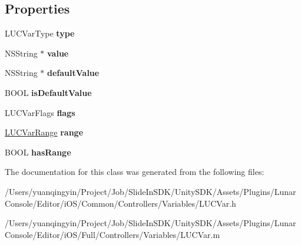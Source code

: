 \subsection*{Properties}
\begin{DoxyCompactItemize}
\item 
\mbox{\label{interface_l_u_c_var_ab256a8b58836897b72dfe62b1a523317}} 
L\+U\+C\+Var\+Type {\bfseries type}
\item 
\mbox{\label{interface_l_u_c_var_aca1ae7f141c51baf7ff645f66730e285}} 
N\+S\+String $\ast$ {\bfseries value}
\item 
\mbox{\label{interface_l_u_c_var_a3f52cda413bfbde01e5197d86fa3f0cb}} 
N\+S\+String $\ast$ {\bfseries default\+Value}
\item 
\mbox{\label{interface_l_u_c_var_ad9e5e4b12e21771baef869c78fde1b04}} 
B\+O\+OL {\bfseries is\+Default\+Value}
\item 
\mbox{\label{interface_l_u_c_var_a01d88c6273b96f54a14eb3106fd8e41a}} 
L\+U\+C\+Var\+Flags {\bfseries flags}
\item 
\mbox{\label{interface_l_u_c_var_ace9fd80188a7cc48a2b0e0d84e993ba2}} 
\mbox{\hyperlink{struct___l_u_c_var_range}{L\+U\+C\+Var\+Range}} {\bfseries range}
\item 
\mbox{\label{interface_l_u_c_var_aeb476c5d70d20d79b7755dc9270c46f7}} 
B\+O\+OL {\bfseries has\+Range}
\end{DoxyCompactItemize}


The documentation for this class was generated from the following files\+:\begin{DoxyCompactItemize}
\item 
/\+Users/yuanqingyin/\+Project/\+Job/\+Slide\+In\+S\+D\+K/\+Unity\+S\+D\+K/\+Assets/\+Plugins/\+Lunar\+Console/\+Editor/i\+O\+S/\+Common/\+Controllers/\+Variables/L\+U\+C\+Var.\+h\item 
/\+Users/yuanqingyin/\+Project/\+Job/\+Slide\+In\+S\+D\+K/\+Unity\+S\+D\+K/\+Assets/\+Plugins/\+Lunar\+Console/\+Editor/i\+O\+S/\+Full/\+Controllers/\+Variables/L\+U\+C\+Var.\+m\end{DoxyCompactItemize}
